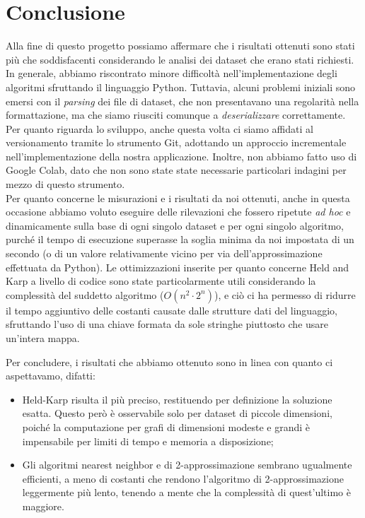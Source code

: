 \section{Conclusione}

Alla fine di questo progetto possiamo affermare che i risultati ottenuti sono stati più che soddisfacenti considerando le analisi dei dataset che erano stati richiesti. In generale, abbiamo riscontrato minore difficoltà nell'implementazione degli algoritmi sfruttando il linguaggio Python. Tuttavia, alcuni problemi iniziali sono emersi con il \textit{parsing} dei file di dataset, che non presentavano una regolarità nella formattazione, ma che siamo riusciti comunque a \textit{deserializzare} correttamente. \\ %
Per quanto riguarda lo sviluppo, anche questa volta ci siamo affidati al versionamento tramite lo strumento Git, adottando un approccio incrementale nell'implementazione della nostra applicazione. Inoltre, non abbiamo fatto uso di Google Colab, dato che non sono state state necessarie particolari indagini per mezzo di questo strumento. \\
Per quanto concerne le misurazioni e i risultati da noi ottenuti, anche in questa occasione abbiamo voluto eseguire delle rilevazioni che fossero ripetute \textit{ad hoc} e dinamicamente sulla base di ogni singolo dataset e per ogni singolo algoritmo, purché il tempo di esecuzione superasse la soglia minima da noi impostata di un secondo (o di un valore relativamente vicino per via dell'approssimazione effettuata da Python).
Le ottimizzazioni inserite per quanto concerne Held and Karp a livello di codice sono state particolarmente utili considerando la complessità del suddetto algoritmo (\(O(n^2\cdot2^n)\)), e ciò ci ha permesso di ridurre il tempo aggiuntivo delle costanti causate dalle strutture dati del linguaggio, sfruttando l'uso di una chiave formata da sole stringhe piuttosto che usare un'intera mappa. 

\noindent Per concludere, i risultati che abbiamo ottenuto sono in linea con quanto ci aspettavamo, difatti:
\begin{itemize}
  \item Held-Karp risulta il più preciso, restituendo per definizione la soluzione esatta. Questo però è osservabile solo per dataset di piccole dimensioni, poiché la computazione per grafi di dimensioni modeste e grandi è impensabile per limiti di tempo e memoria a disposizione;
  \item Gli algoritmi nearest neighbor e di 2-approssimazione sembrano ugualmente efficienti, a meno di costanti che rendono l'algoritmo di 2-approssimazione leggermente più lento, tenendo a mente che la complessità di quest'ultimo è maggiore.
\end{itemize}

